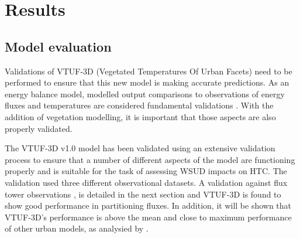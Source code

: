 \documentclass[preprint,12pt,authoryear]{elsarticle}
\begin{document}
%
%
%


\section{Results}
\subsection{Model evaluation}
Validations of VTUF-3D (Vegetated Temperatures Of Urban Facets) need to be performed to ensure that this new model is making accurate predictions. As an energy balance model, modelled output comparisons to observations of energy fluxes and temperatures are considered fundamental validations \citep{Masson2002a}. With the addition of vegetation modelling, it is important that those aspects are also properly validated. 

The VTUF-3D v1.0 model has been validated using an extensive validation process to ensure that a number of different aspects of the model are functioning properly and is suitable for the task of assessing WSUD impacts on HTC. The validation used three different observational datasets. A validation against flux tower observations \citep{Coutts2007}, is detailed in the next section and VTUF-3D is found to show good performance in partitioning fluxes. In addition, it will be shown that VTUF-3D's performance is above the mean and close to maximum performance of other urban models, as analysied by \cite{Best2012}. 
\end{document}
